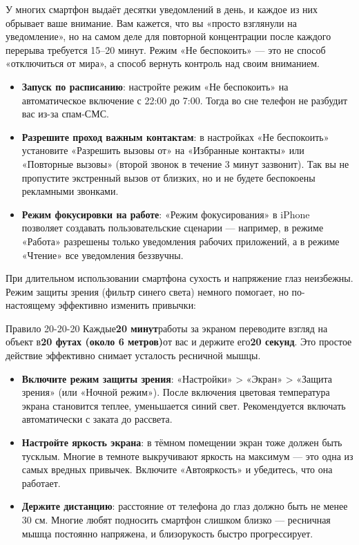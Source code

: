 
У многих смартфон выдаёт десятки уведомлений в день, и каждое из них обрывает ваше внимание. Вам кажется, что вы «просто взглянули на уведомление», но на самом деле для повторной концентрации после каждого перерыва требуется 15–20 минут. Режим «Не беспокоить» — это не способ «отключиться от мира», а способ вернуть контроль над своим вниманием.

\begin{itemize}
  \item \textbf{Запуск по расписанию}: настройте режим «Не беспокоить» на автоматическое включение с 22:00 до 7:00. Тогда во сне телефон не разбудит вас из-за спам-СМС.
  \item \textbf{Разрешите проход важным контактам}: в настройках «Не беспокоить» установите «Разрешить вызовы от» на «Избранные контакты» или «Повторные вызовы» (второй звонок в течение 3 минут зазвонит). Так вы не пропустите экстренный вызов от близких, но и не будете беспокоены рекламными звонками.
  \item \textbf{Режим фокусировки на работе}: «Режим фокусирования» в iPhone позволяет создавать пользовательские сценарии — например, в режиме «Работа» разрешены только уведомления рабочих приложений, а в режиме «Чтение» все уведомления беззвучны.
\end{itemize}


При длительном использовании смартфона сухость и напряжение глаз неизбежны. Режим защиты зрения (фильтр синего света) немного помогает, но по-настоящему эффективно изменить привычки:

\begin{tcbinfo}{Правило 20-20-20}
Каждые\textbf{20 минут}работы за экраном переводите взгляд на объект в\textbf{20 футах (около 6 метров)}от вас и держите его\textbf{20 секунд}. Это простое действие эффективно снимает усталость ресничной мышцы.

\end{tcbinfo}

\begin{itemize}
  \item \textbf{Включите режим защиты зрения}: «Настройки» > «Экран» > «Защита зрения» (или «Ночной режим»). После включения цветовая температура экрана становится теплее, уменьшается синий свет. Рекомендуется включать автоматически с заката до рассвета.
  \item \textbf{Настройте яркость экрана}: в тёмном помещении экран тоже должен быть тусклым. Многие в темноте выкручивают яркость на максимум — это одна из самых вредных привычек. Включите «Автояркость» и убедитесь, что она работает.
  \item \textbf{Держите дистанцию}: расстояние от телефона до глаз должно быть не менее 30 см. Многие любят подносить смартфон слишком близко — ресничная мышца постоянно напряжена, и близорукость быстро прогрессирует.
\end{itemize}

